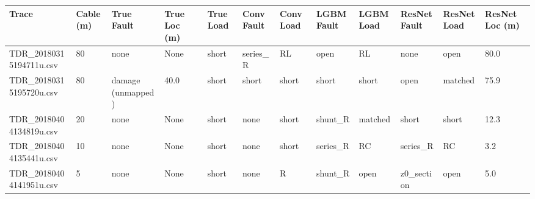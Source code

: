 \begin{tabular}{llllllllllll}
\toprule
Trace & Cable (m) & True Fault & True Loc (m) & True Load & Conv Fault & Conv Load & LGBM Fault & LGBM Load & ResNet Fault & ResNet Load & ResNet Loc (m) \\
\midrule
TDR\_20180315194711u.csv & 80 & none & None & short & series\_R & RL & open & RL & none & open & 80.0 \\
TDR\_20180315195720u.csv & 80 & damage (unmapped) & 40.0 & short & short & short & short & short & open & matched & 75.9 \\
TDR\_20180404134819u.csv & 20 & none & None & short & none & short & shunt\_R & matched & short & short & 12.3 \\
TDR\_20180404135441u.csv & 10 & none & None & short & none & short & series\_R & RC & series\_R & RC & 3.2 \\
TDR\_20180404141951u.csv & 5 & none & None & short & none & R & shunt\_R & open & z0\_section & open & 5.0 \\
\bottomrule
\end{tabular}

